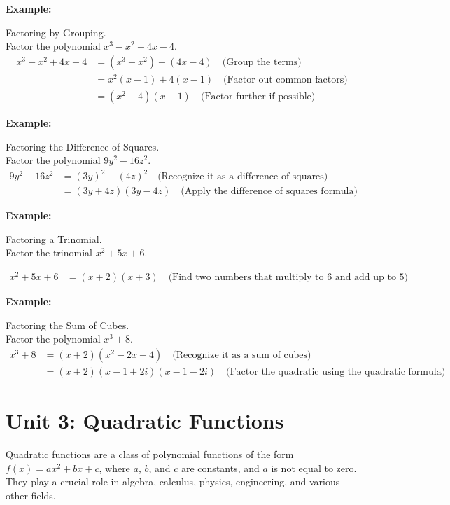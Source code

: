 \documentclass[12pt,a4paper]{article}
\newenvironment{example}
  {\begin{framed}\colorbox{examplecolor}{
  \parbox{\dimexpr\linewidth-2\fboxsep}{
  \textbf{Example:}}}}
  {\end{framed}}
\begin{document}
\begin{example}
Factoring by Grouping.\\
Factor the polynomial $x^3 - x^2 + 4x - 4$.
\begin{align*}
x^3 - x^2 + 4x - 4 &= (x^3 - x^2) + (4x - 4) \quad \text{(Group the terms)} \\
&= x^2(x - 1) + 4(x - 1) \quad \text{(Factor out common factors)} \\
&= (x^2 + 4)(x - 1) \quad \text{(Factor further if possible)}
\end{align*}
\end{example}
\begin{example}
Factoring the Difference of Squares.\\
Factor the polynomial $9y^2 - 16z^2$.
\begin{align*}
9y^2 - 16z^2 &= (3y)^2 - (4z)^2 \quad \text{(Recognize it as a difference of squares)} \\
&= (3y + 4z)(3y - 4z) \quad \text{(Apply the difference of squares formula)}
\end{align*}
\end{example}
\begin{example}
Factoring a Trinomial.\\
Factor the trinomial $x^2 + 5x + 6$.

\begin{align*}
x^2 + 5x + 6 &= (x + 2)(x + 3) \quad \text{(Find two numbers that multiply to 6 and add up to 5)}
\end{align*}
\end{example}
\begin{example}
Factoring the Sum of Cubes.\\
Factor the polynomial $x^3 + 8$.
\begin{align*}
x^3 + 8 &= (x + 2)(x^2 - 2x + 4) \quad \text{(Recognize it as a sum of cubes)} \\
&= (x + 2)(x - 1 + 2i)(x - 1 - 2i) \quad \text{(Factor the quadratic using the quadratic formula)}
\end{align*}
\end{example}
\newpage 

\newpage
\section{Unit 3: Quadratic Functions}
Quadratic functions are a class of polynomial functions of the form $f(x) = ax^2 + bx + c$, where $a$, $b$, and $c$ are constants, and $a$ is not equal to zero. They play a crucial role in algebra, calculus, physics, engineering, and various other fields. 
\end{document}
